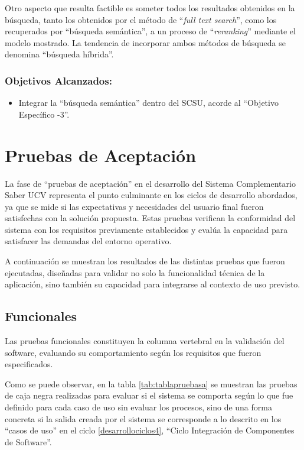 \documentclass[
  12pt,
  openany]{book}
\providecommand{\tightlist}{%
  \setlength{\itemsep}{0pt}\setlength{\parskip}{0pt}}
\begin{document}
Otro aspecto que resulta factible es someter todos los resultados obtenidos en la búsqueda, tanto los obtenidos por el método de ``\emph{full text search}'', como los recuperados por ``búsqueda semántica'', a un proceso de ``\emph{reranking}'' mediante el modelo mostrado. La tendencia de incorporar ambos métodos de búsqueda se denomina ``búsqueda híbrida''.

\hypertarget{objetivos-alcanzados-4}{%
\subsubsection{Objetivos Alcanzados:}\label{objetivos-alcanzados-4}}

\begin{itemize}
\tightlist
\item
  Integrar la ``búsqueda semántica'' dentro del SCSU, acorde al ``Objetivo Específico -3''.
\end{itemize}

\newpage

\hypertarget{pruebas}{%
\section{Pruebas de Aceptación}\label{pruebas}}

La fase de ``pruebas de aceptación'' en el desarrollo del Sistema Complementario Saber UCV representa el punto culminante en los ciclos de desarrollo abordados, ya que se mide si las expectativas y necesidades del usuario final fueron satisfechas con la solución propuesta. Estas pruebas verifican la conformidad del sistema con los requisitos previamente establecidos y evalúa la capacidad para satisfacer las demandas del entorno operativo.

A continuación se muestran los resultados de las distintas pruebas que fueron ejecutadas, diseñadas para validar no solo la funcionalidad técnica de la aplicación, sino también su capacidad para integrarse al contexto de uso previsto.

\hypertarget{pruebas1}{%
\subsection{Funcionales}\label{pruebas1}}

Las pruebas funcionales constituyen la columna vertebral en la validación del software, evaluando su comportamiento según los requisitos que fueron especificados.

Como se puede observar, en la tabla \ref{tab:tablapruebasa} se muestran las pruebas de caja negra realizadas para evaluar si el sistema se comporta según lo que fue definido para cada caso de uso sin evaluar los procesos, sino de una forma concreta si la salida creada por el sistema se corresponde a lo descrito en los ``casos de uso'' en el ciclo \ref{desarrollociclos4}, ``Ciclo Integración de Componentes de Software''.
\end{document}
